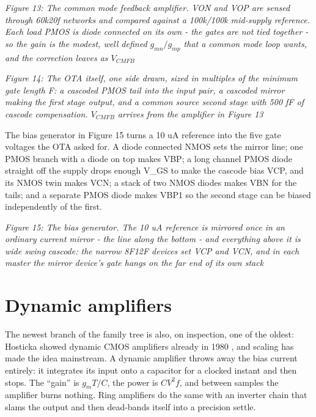 {
\centering
{}
}

\emph{Figure 13: The common mode feedback amplifier. VON and VOP are
sensed through 60k\textbar\textbar20f networks and compared against a
100k/100k mid-supply reference. Each load PMOS is diode connected on its
own - the gates are not tied together - so the gain is the modest, well
defined \(g_{mn}/g_{mp}\) that a common mode loop wants, and the
correction leaves as \(V_{CMFB}\)}


{
\centering
{}
}

\emph{Figure 14: The OTA itself, one side drawn, sized in multiples of
the minimum gate length F: a cascoded PMOS tail into the input pair, a
cascoded mirror making the first stage output, and a common source
second stage with 500 fF of cascode compensation. \(V_{CMFB}\) arrives
from the amplifier in Figure 13}

The bias generator in Figure 15 turns a 10 uA reference into the five
gate voltages the OTA asked for. A diode connected NMOS sets the mirror
line; one PMOS branch with a diode on top makes VBP; a long channel PMOS
diode straight off the supply drops enough V\_GS to make the cascode
bias VCP, and its NMOS twin makes VCN; a stack of two NMOS diodes makes
VBN for the tails; and a separate PMOS diode makes VBP1 so the second
stage can be biased independently of the first.


{
\centering
{}
}

\emph{Figure 15: The bias generator. The 10 uA reference is mirrored
once in an ordinary current mirror - the line along the bottom - and
everything above it is wide swing cascode: the narrow 8F12F devices set
VCP and VCN, and in each master the mirror device's gate hangs on the
far end of its own stack}

\section{Dynamic amplifiers}\label{dynamic-amplifiers}

The newest branch of the family tree is also, on inspection, one of the
oldest: Hosticka showed dynamic CMOS amplifiers already in 1980
, and scaling has made the idea
mainstream. A dynamic amplifier throws away the bias current entirely:
it integrates its input onto a capacitor for a clocked instant and then
stops. The ``gain'' is \(g_m T / C\), the power is \(C V^2 f\), and
between samples the amplifier burns nothing. Ring amplifiers
 do the same with an inverter chain
that slams the output and then dead-bands itself into a precision
settle.

